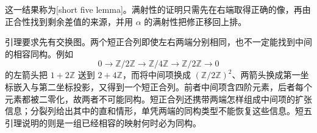 这一结果称为[short five lemma]。满射性的证明只需先在右端取得正确的像，再由正合性找到剩余差值的来源，并用 \(\alpha\) 的满射性把修正移回上排。

\ProseParagraphBreak
引理要求先有交换图。两个短正合列即使左右两端分别相同，也不一定能找到中间的相容同构。例如
\[
	0\longrightarrow\mathbb Z/2\mathbb Z\longrightarrow\mathbb Z/4\mathbb Z \longrightarrow\mathbb Z/2\mathbb Z\longrightarrow0
\]
的左箭头把 \(1+2\mathbb Z\) 送到 \(2+4\mathbb Z\)，而将中间项换成 \((\mathbb Z/2\mathbb Z)^2\)、两箭头换成第一坐标嵌入与第二坐标投影，又得到一个短正合列。前者中间项含四阶元素，后者每个元素都被二零化，故两者不可能同构。短正合列还携带两端怎样组成中间项的扩张信息；分裂列给出其中的直和情形，单凭两端的同构类型不能恢复这些信息。短五引理说明的则是一组已经相容的映射何时必为同构。

